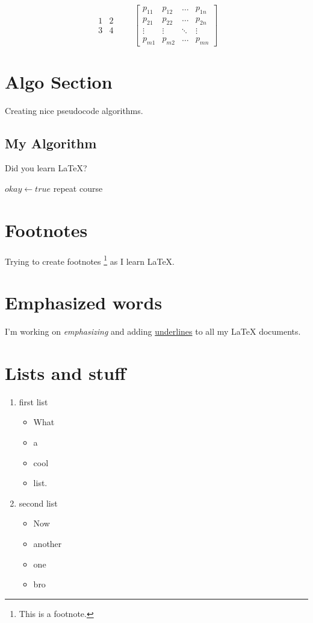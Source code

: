 \documentclass{article}
\begin{document}
\bigskip
\begin{equation*}
  \begin{matrix}
1 & 2 \\
3&4 \end{matrix} \qquad \begin{bmatrix}
    p_{11} & p_{12} & \ldots
    & p_{1n} \\
    p_{21} & p_{22} & \ldots
    & p_{2n} \\
    \vdots & \vdots & \ddots
    & \vdots \\
    p_{m1} & p_{m2} & \ldots
    & p_{mn}
  \end{bmatrix}
\end{equation*}

\section{Algo Section}

Creating nice pseudocode algorithms.

\subsection{My Algorithm}

Did you learn \LaTeX?

\begin{algorithmic}
	\State $okay \gets true$
\Else
		\State repeat course
	\EndWhile
\EndIf
\end{algorithmic}

\section{Footnotes}
Trying to create footnotes \footnote{This is a footnote.} as I learn \LaTeX.

\section{Emphasized words}
I'm working on \emph{emphasizing} and adding \underline{underlines} to all my \LaTeX{} documents.

\section{Lists and stuff}
\begin{enumerate}
\item first list
\begin{itemize}
\item What 
\item a 
\item cool
\item list.  
\end{itemize}
\item second list
\begin{itemize}
\item Now 
\item another
\item one
\item bro 
\end{itemize}
\end{enumerate}
\end{document}
